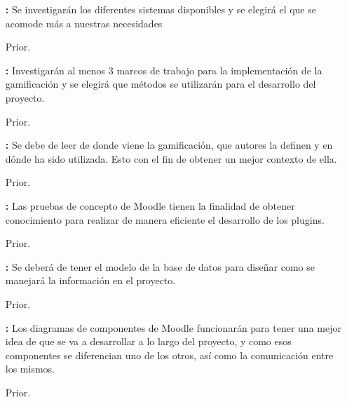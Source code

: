 \begin{multicols}{2}
\begin{itemize}
    	\item[\bf \ida] {\bf \desc:} Se investigarán los diferentes sistemas disponibles y se elegirá el que se acomode más a nuestras necesidades
        \item[Prior.] \Valor
\end{itemize}

\begin{itemize}
    	\item[\bf \ida] {\bf \desc:} Investigarán al menos 3 marcos de trabajo para la implementación de la gamificación y se elegirá que métodos se utilizarán para el desarrollo del proyecto. 
        \item[Prior.] \Valor
\end{itemize}

\begin{itemize}
    	\item[\bf \ida] {\bf \desc:} Se debe de leer de donde viene la gamificación, que autores la definen y en dónde ha sido utilizada. Esto con el fin de obtener un mejor contexto de ella.
        \item[Prior.] \Valor
\end{itemize}

\begin{itemize}
    	\item[\bf \ida] {\bf \desc:} Las pruebas de concepto de Moodle tienen la finalidad de obtener conocimiento para realizar de manera eficiente el desarrollo de los plugins.
        \item[Prior.] \Valor
\end{itemize}

\begin{itemize}
    	\item[\bf \ida] {\bf \desc:} Se deberá de tener el modelo de la base de datos para diseñar como se manejará la información en el proyecto.
        \item[Prior.] \Valor
\end{itemize}

\begin{itemize}
    	\item[\bf \ida] {\bf \desc:} Los diagramas de componentes de Moodle funcionarán para tener una mejor idea de que se va a desarrollar a lo largo del proyecto, y como esos componentes se diferencian uno de los otros, así como la comunicación entre los mismos.
        \item[Prior.] \Valor
\end{itemize}


\end{multicols}
